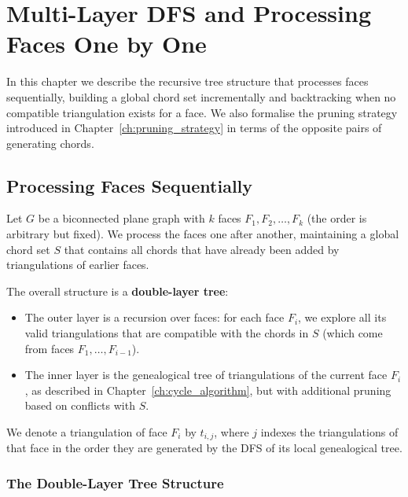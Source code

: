 
\chapter{Multi-Layer DFS and Processing Faces One by One}
\label{ch:multi_layer_dfs}

In this chapter we describe the recursive tree structure that processes faces sequentially, building a global chord set incrementally and backtracking when no compatible triangulation exists for a face. 
We also formalise the pruning strategy introduced in Chapter~\ref{ch:pruning_strategy} in terms of the opposite pairs of generating chords.

\section{Processing Faces Sequentially}
\label{sec:sequential_faces}

Let \(G\) be a biconnected plane graph with \(k\) faces \(F_1, F_2, \dots, F_k\) (the order is arbitrary but fixed). 
We process the faces one after another, maintaining a global chord set \(S\) that contains all chords that have already been added by triangulations of earlier faces.

The overall structure is a \textbf{double-layer tree}:
\begin{itemize}
    \item The outer layer is a recursion over faces: for each face \(F_i\), we explore all its valid triangulations that are compatible with the chords in \(S\) (which come from faces \(F_1, \dots, F_{i-1}\)).
    \item The inner layer is the genealogical tree of triangulations of the current face \(F_i\), as described in Chapter~\ref{ch:cycle_algorithm}, but with additional pruning based on conflicts with \(S\).
\end{itemize}

We denote a triangulation of face \(F_i\) by \(t_{i,j}\), where \(j\) indexes the triangulations of that face in the order they are generated by the DFS of its local genealogical tree.

\subsection{The Double-Layer Tree Structure}
\label{subsec:double_layer}

